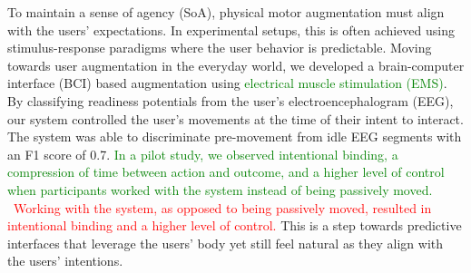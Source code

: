 To maintain a sense of agency (SoA), physical motor augmentation must align with the users' expectations. In experimental setups, this is often achieved using stimulus-response paradigms where the user behavior is predictable. Moving towards user augmentation in the everyday world, we developed a brain-computer interface (BCI) based augmentation using \textcolor{green}{electrical muscle stimulation (EMS)}. By classifying readiness potentials from the user's electroencephalogram (EEG), our system controlled the user's movements at the time of their intent to interact. The system was able to discriminate pre-movement from idle EEG segments with an F1 score of 0.7. \textcolor{green}{In a pilot study, we observed intentional binding, a compression of time between action and outcome, and a higher level of control when participants worked with the system instead of being passively moved.} ~\textcolor{red}{Working with the system, as opposed to being passively moved, resulted in intentional binding and a higher level of control.} This is a step towards predictive interfaces that leverage the users’ body yet still feel natural as they align with the users’ intentions.




